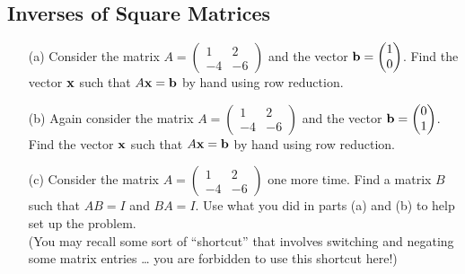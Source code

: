 \subsection{Inverses of Square Matrices}
\begin{problem}
    \begin{enumerate}
        \item[(a)] Consider the matrix $A = \begin{pmatrix}
                1&2\\-4&-6\end{pmatrix}$ and the vector ${\bf b} = \begin{pmatrix}
                1\\0\end{pmatrix}$.
            Find the vector ${\bf x}$ such that $A{\bf x} = {\bf b}$ by hand using row reduction.  
        \item[(b)] Again consider the matrix $A = \begin{pmatrix}
                1&2\\-4&-6\end{pmatrix}$ and the vector ${\bf b} = \begin{pmatrix}
                0\\1\end{pmatrix}$.
            Find the vector ${\bf x}$ such that $A{\bf x} = {\bf b}$ by hand using row reduction.  
        \item[(c)] Consider the matrix $A = \begin{pmatrix} 1 & 2 \\ -4 & -6
            \end{pmatrix}$ one more time.  Find a matrix $B$ such that $AB = I$ and $BA = I$.  Use what
            you did in parts (a) and (b) to help set up the problem. \\ (You may recall some sort
            of ``shortcut'' that involves switching and negating some matrix entries \dots
            you are forbidden to use this shortcut here!)
    \end{enumerate}
\end{problem}

